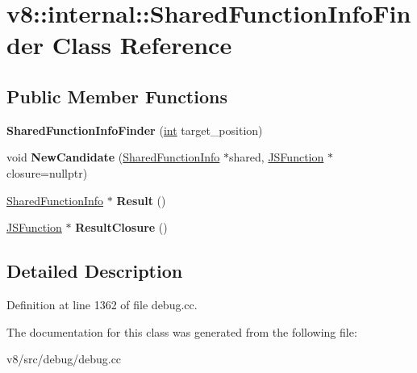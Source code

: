 \hypertarget{classv8_1_1internal_1_1SharedFunctionInfoFinder}{}\section{v8\+:\+:internal\+:\+:Shared\+Function\+Info\+Finder Class Reference}
\label{classv8_1_1internal_1_1SharedFunctionInfoFinder}
\subsection*{Public Member Functions}
\begin{DoxyCompactItemize}
\item 
\mbox{\label{classv8_1_1internal_1_1SharedFunctionInfoFinder_a79a9cb16f297cf409da1e490ab54b66d}} 
{\bfseries Shared\+Function\+Info\+Finder} (\mbox{\hyperlink{classint}{int}} target\+\_\+position)
\item 
\mbox{\label{classv8_1_1internal_1_1SharedFunctionInfoFinder_a7939d3b5ac27e4ec19790cc16260a8b1}} 
void {\bfseries New\+Candidate} (\mbox{\hyperlink{classv8_1_1internal_1_1SharedFunctionInfo}{Shared\+Function\+Info}} $\ast$shared, \mbox{\hyperlink{classv8_1_1internal_1_1JSFunction}{J\+S\+Function}} $\ast$closure=nullptr)
\item 
\mbox{\label{classv8_1_1internal_1_1SharedFunctionInfoFinder_adbfac679c8b6234b74312d26a150d8c1}} 
\mbox{\hyperlink{classv8_1_1internal_1_1SharedFunctionInfo}{Shared\+Function\+Info}} $\ast$ {\bfseries Result} ()
\item 
\mbox{\label{classv8_1_1internal_1_1SharedFunctionInfoFinder_a77afa850977bbad13be99ac4af55519a}} 
\mbox{\hyperlink{classv8_1_1internal_1_1JSFunction}{J\+S\+Function}} $\ast$ {\bfseries Result\+Closure} ()
\end{DoxyCompactItemize}


\subsection{Detailed Description}


Definition at line 1362 of file debug.\+cc.



The documentation for this class was generated from the following file\+:\begin{DoxyCompactItemize}
\item 
v8/src/debug/debug.\+cc\end{DoxyCompactItemize}
